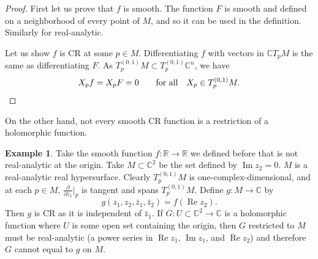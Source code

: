 \documentclass[12pt,openany]{book}
\renewcommand{\Re}{\operatorname{Re}}
\renewcommand{\Im}{\operatorname{Im}}
\newcommand{\C}{{\mathbb{C}}}
\newcommand{\R}{{\mathbb{R}}}
\theoremstyle{plain}
\theoremstyle{remark}
\theoremstyle{definition}
\theoremstyle{exercise}
\theoremstyle{example}
\newtheorem{example}[thm]{Example}
\begin{document}
\begin{proof}
First let us prove that $f$ is smooth.  The function $F$ is smooth and
defined on a neighborhood of every point of $M$, and so it can be used in the
definition.
Similarly for real-analytic.

Let us show $f$ is CR at some $p \in M$.
Differentiating $f$ with vectors in $\C T_pM$
is the same as differentiating $F$.
As $T_p^{(0,1)} M \subset T_p^{(0,1)} \C^n$, we have
\begin{equation*}
X_p f = X_p F = 0 \qquad \text{for all} \quad X_p \in T_p^{(0,1)} M.
\qedhere
\end{equation*}
\end{proof}

On the other hand, not every smooth CR function is a restriction of a holomorphic function.

\begin{example}
Take the smooth function $f \colon \R \to \R$ we defined before
that is not real-analytic at the origin.
Take $M \subset \C^2$ be the set defined by $\Im z_2 = 0$.
$M$ is a
real-analytic real hypersurface.  Clearly
$T_p^{(0,1)} M$ is one-complex-dimensional, and at each $p \in M$,
$\frac{\partial}{\partial \bar{z}_1}\big|_p$ is tangent and spans
$T_p^{(0,1)} M$.  Define $g \colon M \to \C$ by
\begin{equation*}
g(z_1,z_2,\bar{z}_1,\bar{z}_2) = f(\Re z_2) .
\end{equation*}
Then $g$ is CR as it is independent of $\bar{z}_1$.
If $G \colon U \subset \C^2 \to \C$ is a holomorphic
function where $U$ is some open set containing the origin, then $G$
restricted to $M$ must be real-analytic (a power series in $\Re z_1$, $\Im
z_1$, and $\Re z_2$) and therefore $G$ cannot equal to
$g$ on $M$.
\end{example}
\end{document}
